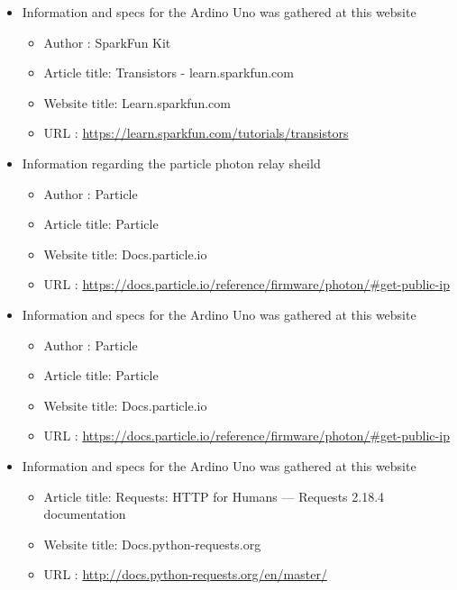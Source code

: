 \documentclass{article}
\begin{document}
\begin{thebibliography}{56}
    \begin{itemize}
        \item Information and specs for the Ardino Uno was gathered at this website
        \begin{itemize}
            \item Author       : SparkFun Kit
            \item Article title: Transistors - learn.sparkfun.com
            \item Website title: Learn.sparkfun.com
            \item URL          : \url{https://learn.sparkfun.com/tutorials/transistors}
        \end{itemize}
    \end{itemize}

    \begin{itemize}
        \item Information regarding the particle photon relay sheild
        \begin{itemize}
            \item Author       : Particle
            \item Article title: Particle
            \item Website title: Docs.particle.io
            \item URL          : \url{https://docs.particle.io/reference/firmware/photon/#get-public-ip}
        \end{itemize}
    \end{itemize}

    \begin{itemize}
        \item Information and specs for the Ardino Uno was gathered at this website
        \begin{itemize}
            \item Author       : Particle
            \item Article title: Particle
            \item Website title: Docs.particle.io
            \item URL          : \url{https://docs.particle.io/reference/firmware/photon/#get-public-ip}
        \end{itemize}
    \end{itemize}

    \begin{itemize}
        \item Information and specs for the Ardino Uno was gathered at this website
        \begin{itemize}
            \item Article title: Requests: HTTP for Humans — Requests 2.18.4 documentation
            \item Website title: Docs.python-requests.org
            \item URL          : \url{http://docs.python-requests.org/en/master/}
        \end{itemize}
    \end{itemize}
\end{thebibliography}
\end{document}
